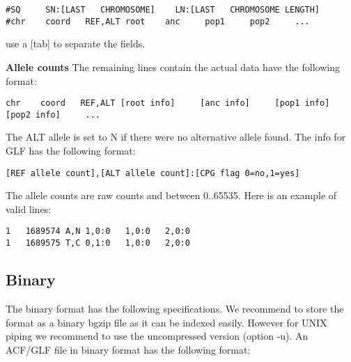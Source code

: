\documentclass[a4paper]{article}
\begin{document}

\begin{lstlisting}
#SQ     SN:[LAST   CHROMOSOME]    LN:[LAST   CHROMOSOME LENGTH]
#chr    coord   REF,ALT root    anc     pop1     pop2     ...
\end{lstlisting}

\noindent use a [tab] to separate the fields. 

\noindent \textbf{Allele counts}
\noindent The remaining lines contain the actual data have the following format:

\begin{lstlisting}
chr    coord   REF,ALT [root info]     [anc info]     [pop1 info]     [pop2 info]     ...
\end{lstlisting}

\noindent  The ALT allele is set to N if there were no alternative allele found. The info for GLF has the following format:

\begin{lstlisting}
[REF allele count],[ALT allele count]:[CPG flag 0=no,1=yes]
\end{lstlisting}

\noindent  The allele counts are raw counts and between 0..65535. Here is an example of valid lines:

\begin{lstlisting}
1	1689574	A,N	1,0:0	1,0:0	2,0:0
1	1689575	T,C	0,1:0	1,0:0	2,0:0
\end{lstlisting}



\subsection{Binary}


\noindent The binary format has the following specifications. We recommend to store the format as a binary bgzip file as it can be indexed easily. However for UNIX piping we recommend to use the uncompressed version (option -u). An ACF/GLF file in binary format has the following format:

\end{document}

